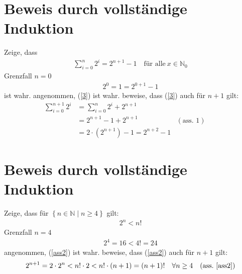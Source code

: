\documentclass{article}
\begin{document}
\section{Beweis durch vollständige Induktion} 
Zeige, dass
\begin{align}
    \label{3}
    \sum_{i=0}^n 2 ^{i} = 2 ^{n+1} -1 \quad \text{für alle}\ x \in \mathbb{N}_0
\end{align}
Grenzfall \( n=0 \)
\begin{align}
    2 ^{0} = 1 = 2 ^{0+1} - 1
\end{align}
ist wahr.
angenommen, (\ref{3}) ist wahr. beweise, dass (\ref{3}) auch für \( n+1 \) gilt:
\begin{align}
    \sum_{i=0} ^{n+1} 2 ^{i} &= \sum_{i = 0} ^{n} 2 ^{i} + 2 ^{n+1} \label{ass1}\\
    &= 2 ^{n+1} -1 + 2 ^{n+1} & (\text{ass. 1} )&&\\
    &= 2 \cdot \left( 2 ^{n+1} \right) -1 = 2 ^{n+2} - 1
\end{align}

\section{Beweis durch vollständige Induktion}
Zeige, dass für \( \left\{ n \in \mathbb{N} \mid n \geq 4 \right\} \) gilt:
\begin{align}
\label{ass2}
    2 ^{n} < n! 
\end{align}
Grenzfall \( n = 4 \)
\begin{align}
    2 ^{4} = 16 < 4! = 24
\end{align}
angenommen, (\ref{ass2}) ist wahr. beweise, dass (\ref{ass2}) auch für \( n+1 \) gilt:
\begin{align}
    2 ^{n+1} = 2 \cdot 2 ^{n} < n! \cdot 2 < n! \cdot \left( n+1 \right) =
    \left( n+1 \right) ! \quad \forall n \geq 4 
    & & (\text{ass.}\ \ref{ass2})
\end{align}
\end{document}
